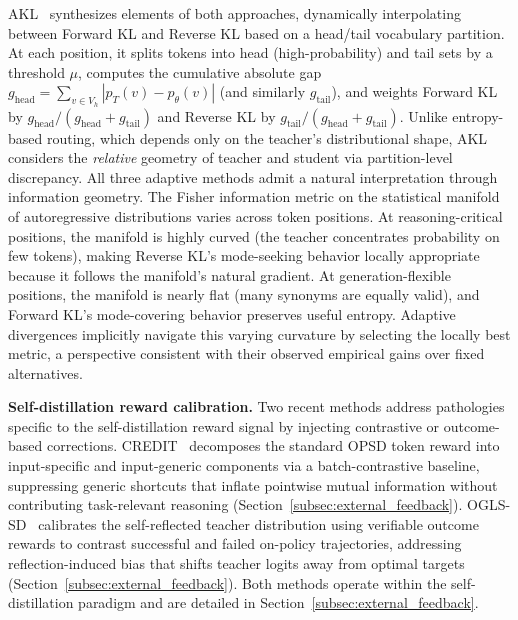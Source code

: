 \documentclass{article} %
\newcommand{\ptheta}{p_\theta}
\newcommand{\pteacher}{p_T}
\begin{document}
AKL~\citep{2404.02657} synthesizes elements of both approaches, dynamically interpolating between Forward KL and Reverse KL based on a head/tail vocabulary partition. At each position, it splits tokens into head (high-probability) and tail sets by a threshold $\mu$, computes the cumulative absolute gap $g_{\text{head}} = \sum_{v \in V_h}|\pteacher(v) - \ptheta(v)|$ (and similarly $g_{\text{tail}}$), and weights Forward KL by $g_{\text{head}}/(g_{\text{head}}+g_{\text{tail}})$ and Reverse KL by $g_{\text{tail}}/(g_{\text{head}}+g_{\text{tail}})$. Unlike entropy-based routing, which depends only on the teacher's distributional shape, AKL considers the \emph{relative} geometry of teacher and student via partition-level discrepancy. All three adaptive methods admit a natural interpretation through information geometry. The Fisher information metric on the statistical manifold of autoregressive distributions varies across token positions. At reasoning-critical positions, the manifold is highly curved (the teacher concentrates probability on few tokens), making Reverse KL's mode-seeking behavior locally appropriate because it follows the manifold's natural gradient. At generation-flexible positions, the manifold is nearly flat (many synonyms are equally valid), and Forward KL's mode-covering behavior preserves useful entropy. Adaptive divergences implicitly navigate this varying curvature by selecting the locally best metric, a perspective consistent with their observed empirical gains over fixed alternatives.

\textbf{Self-distillation reward calibration.} Two recent methods address pathologies specific to the self-distillation reward signal by injecting contrastive or outcome-based corrections. CREDIT~\citep{2605.11613} decomposes the standard OPSD token reward into input-specific and input-generic components via a batch-contrastive baseline, suppressing generic shortcuts that inflate pointwise mutual information without contributing task-relevant reasoning (Section~\ref{subsec:external_feedback}). OGLS-SD~\citep{2605.12400} calibrates the self-reflected teacher distribution using verifiable outcome rewards to contrast successful and failed on-policy trajectories, addressing reflection-induced bias that shifts teacher logits away from optimal targets (Section~\ref{subsec:external_feedback}). Both methods operate within the self-distillation paradigm and are detailed in Section~\ref{subsec:external_feedback}.
\end{document}
